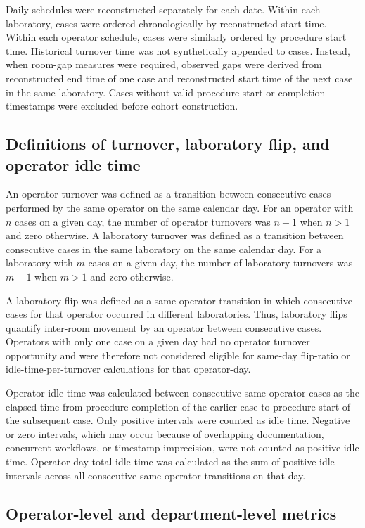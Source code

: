 \documentclass[12pt]{article}
\begin{document}
Daily schedules were reconstructed separately for each date. Within each laboratory, cases were ordered chronologically by reconstructed start time. Within each operator schedule, cases were similarly ordered by procedure start time. Historical turnover time was not synthetically appended to cases. Instead, when room-gap measures were required, observed gaps were derived from reconstructed end time of one case and reconstructed start time of the next case in the same laboratory. Cases without valid procedure start or completion timestamps were excluded before cohort construction.

\subsection{Definitions of turnover, laboratory flip, and operator idle time}

An operator turnover was defined as a transition between consecutive cases performed by the same operator on the same calendar day. For an operator with $n$ cases on a given day, the number of operator turnovers was $n-1$ when $n>1$ and zero otherwise. A laboratory turnover was defined as a transition between consecutive cases in the same laboratory on the same calendar day. For a laboratory with $m$ cases on a given day, the number of laboratory turnovers was $m-1$ when $m>1$ and zero otherwise.

A laboratory flip was defined as a same-operator transition in which consecutive cases for that operator occurred in different laboratories. Thus, laboratory flips quantify inter-room movement by an operator between consecutive cases. Operators with only one case on a given day had no operator turnover opportunity and were therefore not considered eligible for same-day flip-ratio or idle-time-per-turnover calculations for that operator-day.

Operator idle time was calculated between consecutive same-operator cases as the elapsed time from procedure completion of the earlier case to procedure start of the subsequent case. Only positive intervals were counted as idle time. Negative or zero intervals, which may occur because of overlapping documentation, concurrent workflows, or timestamp imprecision, were not counted as positive idle time. Operator-day total idle time was calculated as the sum of positive idle intervals across all consecutive same-operator transitions on that day.

\subsection{Operator-level and department-level metrics}
\end{document}
